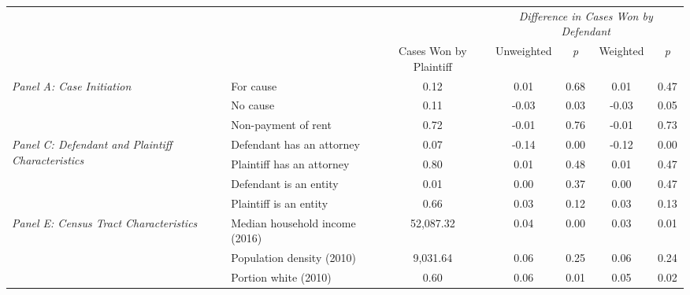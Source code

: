 \begin{tabular}{llccccc}
\toprule
 &  & \textit{} & \multicolumn{4}{c}{\textit{Difference in Cases Won by Defendant}} \\
 &  & Cases Won by Plaintiff & Unweighted & \emph{p} & Weighted & \emph{p} \\
\midrule
\multirow[c]{3}{3cm}{\textit{Panel A: Case Initiation}} & For cause & 0.12 & 0.01 & 0.68 & 0.01 & 0.47 \\
 & No cause & 0.11 & -0.03 & 0.03 & -0.03 & 0.05 \\
 & Non-payment of rent & 0.72 & -0.01 & 0.76 & -0.01 & 0.73 \\
\cline{1-7}
\multirow[c]{4}{3cm}{\textit{Panel C: Defendant and Plaintiff Characteristics}} & Defendant has an attorney & 0.07 & -0.14 & 0.00 & -0.12 & 0.00 \\
 & Plaintiff has an attorney & 0.80 & 0.01 & 0.48 & 0.01 & 0.47 \\
 & Defendant is an entity & 0.01 & 0.00 & 0.37 & 0.00 & 0.47 \\
 & Plaintiff is an entity & 0.66 & 0.03 & 0.12 & 0.03 & 0.13 \\
\cline{1-7}
\multirow[c]{3}{3cm}{\textit{Panel E: Census Tract Characteristics}} & Median household income (2016) & 52,087.32 & 0.04 & 0.00 & 0.03 & 0.01 \\
 & Population density (2010) & 9,031.64 & 0.06 & 0.25 & 0.06 & 0.24 \\
 & Portion white (2010) & 0.60 & 0.06 & 0.01 & 0.05 & 0.02 \\
\cline{1-7}
\bottomrule
\end{tabular}
